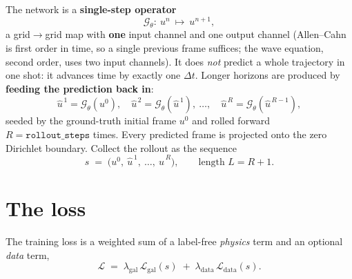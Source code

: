 \documentclass[11pt]{article}
\newcommand{\dt}{\Delta t}
\newcommand{\uhat}{\hat u}
\begin{document}
The network is a \textbf{single-step operator}
\begin{equation}
  \mathcal G_\theta:\ u^{n}\ \longmapsto\ u^{n+1},
\end{equation}
a grid$\to$grid map with \textbf{one} input channel and one output channel (Allen--Cahn is
first order in time, so a single previous frame suffices; the wave equation, second order, uses
two input channels). It does \emph{not} predict a whole trajectory in one shot: it advances time
by exactly one $\dt$. Longer horizons are produced by \textbf{feeding the prediction back in}:
\begin{equation}
  \uhat^{\,1}=\mathcal G_\theta(u^0),\quad
  \uhat^{\,2}=\mathcal G_\theta(\uhat^{\,1}),\ \dots,\quad
  \uhat^{\,R}=\mathcal G_\theta(\uhat^{\,R-1}),
\end{equation}
seeded by the ground-truth initial frame $u^0$ and rolled forward $R=\texttt{rollout\_steps}$
times. Every predicted frame is projected onto the zero Dirichlet boundary. Collect the rollout
as the sequence
\begin{equation}
  s \;=\; \big(u^0,\ \uhat^{\,1},\ \dots,\ \uhat^{\,R}\big),\qquad \text{length } L=R+1 .
\end{equation}

\section{The loss}

The training loss is a weighted sum of a label-free \emph{physics} term and an optional
\emph{data} term,
\begin{equation}
  \mathcal L \;=\; \lambda_{\mathrm{gal}}\,\mathcal L_{\mathrm{gal}}(s)
    \;+\; \lambda_{\mathrm{data}}\,\mathcal L_{\mathrm{data}}(s).
\end{equation}
\end{document}

